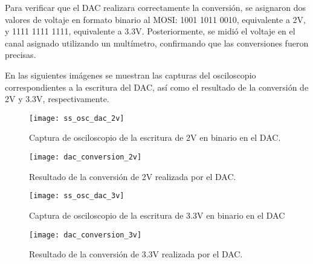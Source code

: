Para verificar que el DAC realizara correctamente la conversión, se asignaron dos valores de voltaje en formato binario al MOSI: 1001 1011 0010, equivalente a 2V, y 1111 1111 1111, equivalente a 3.3V. Posteriormente, se midió el voltaje en el canal asignado utilizando un multímetro, confirmando que las conversiones fueron precisas.


En las siguientes imágenes se muestran las capturas del osciloscopio correspondientes a la escritura del DAC, así como el resultado de la conversión de 2V y 3.3V, respectivamente.

            \begin{figure}[hbtp]
                \centering
                \texttt{[image: ss\_osc\_dac\_2v]}
                \caption{Captura de osciloscopio de la escritura de 2V en binario en el DAC.}
                \label{fig:ss_osc_dac_2v}
            \end{figure}
            
            \begin{figure}[hbtp]
                \centering
                \texttt{[image: dac\_conversion\_2v]}
                \caption{Resultado de la conversión de 2V realizada por el DAC.}
                \label{fig:dac_conversion_2v}
            \end{figure}            
          
            \begin{figure}[hbtp]
                \centering
                \texttt{[image: ss\_osc\_dac\_3v]}
                \caption{Captura de osciloscopio de la escritura de 3.3V en binario en el DAC}
                \label{fig:ss_osc_dac_3v}
            \end{figure}   

            \begin{figure}[hbtp]
                \centering
                \texttt{[image: dac\_conversion\_3v]}
                \caption{Resultado de la conversión de 3.3V realizada por el DAC.}
                \label{fig:dac_conversion_3v}
            \end{figure} 
                                 

